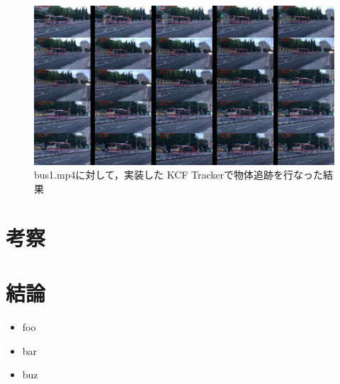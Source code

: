\documentclass[11pt,a4j]{jarticle}
\begin{document}
    \begin{figure}[hbtp]
      \begin{center}
        \includegraphics[clip,width=12.5cm]{./figures/bus1_kcf_impl.jpg}
        \caption{bus1.mp4に対して，実装した KCF Trackerで物体追跡を行なった結果}
        \label{fig:AC_PetriNet}
      \end{center}
    \end{figure}

  \section{考察}
  
  \section{結論}

    \begin{itemize}
      \item foo
      \item bar
      \item buz
    \end{itemize}

\end{document}
